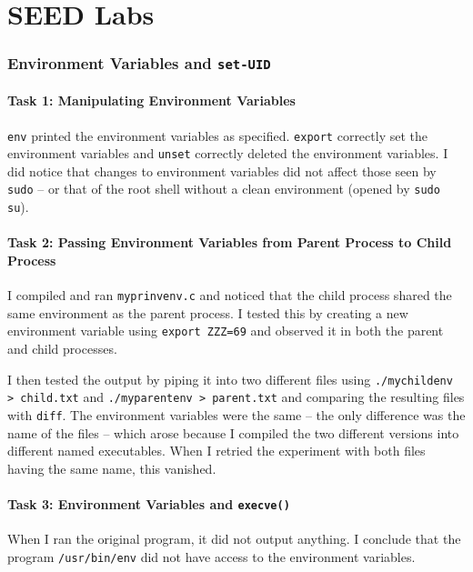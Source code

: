 \documentclass[10pt,\jkfside,a4paper]{article}
\begin{document}
\part{SEED Labs}

\section{Environment Variables and \texttt{set-UID}}

\subsection{Task 1: Manipulating Environment Variables}

\texttt{env} printed the environment variables as specified.
\texttt{export} correctly set the environment variables and \texttt{unset}
correctly deleted the environment variables. I did notice that changes to
environment variables did not affect those seen by \texttt{sudo} -- or that
of the root shell without a clean environment (opened by \texttt{sudo su}).

\subsection{Task 2: Passing Environment Variables from Parent Process to Child Process}

I compiled and ran \texttt{myprinvenv.c} and noticed that the child process
shared the same environment as the parent process. I tested this by creating
a new environment variable using \texttt{export ZZZ=69} and observed it in
both the parent and child processes.

I then tested the output by piping it into two different files using
\texttt{./mychildenv > child.txt} and \texttt{./myparentenv > parent.txt}
and comparing the resulting files with \texttt{diff}. The environment
variables were the same -- the only difference was the name of the files --
which arose because I compiled the two different versions into different
named executables. When I retried the experiment with both files having the
same name, this vanished.

\subsection{Task 3: Environment Variables and \texttt{execve()}}

When I ran the original program, it did not output anything. I conclude that
the program \texttt{/usr/bin/env} did not have access to the environment
variables.
\end{document}
